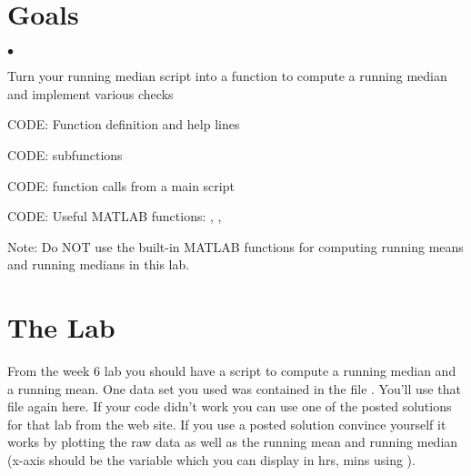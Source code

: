 \documentclass[letterpaper,12pt]{article}
\newcounter{lnum}
\newenvironment{abbrevlist}%
  {\begin{list}{$\bullet$}{\setlength{\leftmargin}{2em}%
               \setlength{\itemindent}{0em}%
               \setlength{\itemsep}{0pt}%
               \setlength{\parsep}{0pt}%
               \setlength{\topsep}{2pt}%
               \usecounter{lnum} } }{\end{list}}
\begin{document}
\section*{Goals}
\begin{abbrevlist}
\item Turn your running median script into a function to compute a running median and implement various checks
\item  CODE:  Function definition and help lines
\item  CODE: subfunctions
\item  CODE: function calls from a main script
\item  CODE: Useful MATLAB functions:  ,   , 
\end{abbrevlist}

Note:  Do NOT use the built-in MATLAB functions for computing running means and running medians in this lab.

\section*{The Lab}

From the week 6 lab you should have a script to compute a running median and a running mean.  
One data set you used was contained in the file .  You'll use that file again here.
If your code didn't work you can use one of the posted solutions for that lab
from the web site.
If you use a posted solution convince yourself it works by plotting the
raw data as well as the running mean and running median (x-axis should be the variable  which 
you can display in hrs, mins using  ).

%
\end{document}
